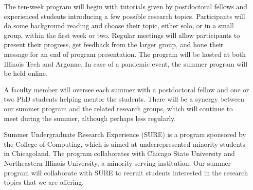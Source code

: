 \documentclass[11pt]{NSFamsart}
\newcommand{\FredNote}[1]{{\color{blue} Fred: #1}}
\begin{document}
The ten-week program will begin with tutorials given by postdoctoral fellows and experienced students introducing a few possible research topics.  Participants will do some background reading and choose their topic, either solo, or in a small group, within the first week or two.  Regular meetings will allow participants to present their progress, get feedback from the larger group, and hone their message for an end of program presentation. The program will be hosted at both Illinois Tech and Argonne.  In case of a pandemic event, the summer program will be held online.

A faculty member will oversee each summer with a postdoctoral fellow and one or two PhD students helping mentor the students.  There will be a synergy between our summer program and the related research groups, which will continue to meet during the summer, although perhaps less regularly.

Summer Undergraduate Research Experience (SURE) is a program sponsored by the College of Computing, which is aimed at underrepresented minority students in Chicagoland.  The program collaborates with Chicago State University and Northeastern Illinois University, a minority serving institution.  Our summer program will collaborate with SURE to recruit students interested in the research topics that we are offering.
 
 

\end{document}
